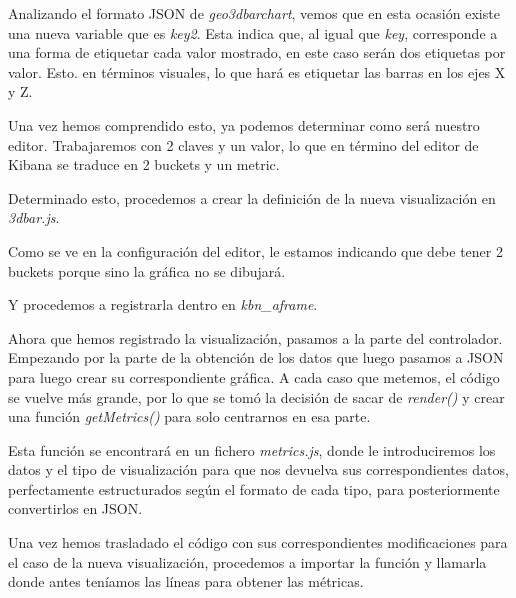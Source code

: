 \documentclass[a4paper, 12pt]{book}
\begin{document}


Analizando el formato JSON de \textit{geo3dbarchart}, vemos que en esta ocasión existe una nueva variable que es \textit{key2}. Esta indica que, al igual que \textit{key}, corresponde a una forma de etiquetar cada valor mostrado, en este caso serán dos etiquetas por valor. Esto. en términos visuales, lo que hará es etiquetar las barras en los ejes X y Z. 

Una vez hemos comprendido esto, ya podemos determinar como será nuestro editor. Trabajaremos con 2 claves y un valor, lo que en término del editor de Kibana se traduce en 2 buckets y un metric. 

Determinado esto, procedemos a crear la definición de la nueva visualización en \textit{3dbar.js}.



Como se ve en la configuración del editor, le estamos indicando que debe tener 2 buckets porque sino la gráfica no se dibujará.

Y procedemos a registrarla dentro en \textit{kbn\_aframe}.



Ahora que hemos registrado la visualización, pasamos a la parte del controlador. Empezando por la parte de la obtención de los datos que luego pasamos a JSON para luego crear su correspondiente gráfica. A cada caso que metemos, el código se vuelve más grande, por lo que se tomó la decisión de sacar de \textit{render()} y crear una función \textit{getMetrics()} para solo centrarnos en esa parte. 

Esta función se encontrará en un fichero \textit{metrics.js}, donde le introduciremos los datos y el tipo de visualización para que nos devuelva sus correspondientes datos, perfectamente estructurados según el formato de cada tipo, para posteriormente convertirlos en JSON.



Una vez hemos trasladado el código con sus correspondientes modificaciones para el caso de la nueva visualización, procedemos a importar la función y llamarla donde antes teníamos las líneas para obtener las métricas.


\end{document}
